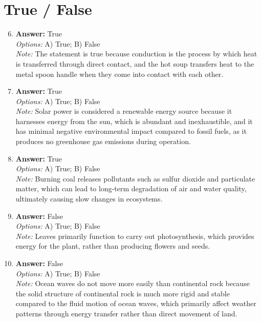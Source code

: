 \documentclass[12pt]{article}
\begin{document}
\section*{True / False}
\begin{enumerate}[label=\arabic*.]
\setcounter{enumi}{5}
\item \textbf{Answer:} True
\\ \textit{Options:} A) True; B) False
\\ \textit{Note:} The statement is true because conduction is the process by which heat is transferred through direct contact, and the hot soup transfers heat to the metal spoon handle when they come into contact with each other.
\item \textbf{Answer:} True
\\ \textit{Options:} A) True; B) False
\\ \textit{Note:} Solar power is considered a renewable energy source because it harnesses energy from the sun, which is abundant and inexhaustible, and it has minimal negative environmental impact compared to fossil fuels, as it produces no greenhouse gas emissions during operation.
\item \textbf{Answer:} True
\\ \textit{Options:} A) True; B) False
\\ \textit{Note:} Burning coal releases pollutants such as sulfur dioxide and particulate matter, which can lead to long-term degradation of air and water quality, ultimately causing slow changes in ecosystems.
\item \textbf{Answer:} False
\\ \textit{Options:} A) True; B) False
\\ \textit{Note:} Leaves primarily function to carry out photosynthesis, which provides energy for the plant, rather than producing flowers and seeds.
\item \textbf{Answer:} False
\\ \textit{Options:} A) True; B) False
\\ \textit{Note:} Ocean waves do not move more easily than continental rock because the solid structure of continental rock is much more rigid and stable compared to the fluid motion of ocean waves, which primarily affect weather patterns through energy transfer rather than direct movement of land.
\end{enumerate}
\end{document}
